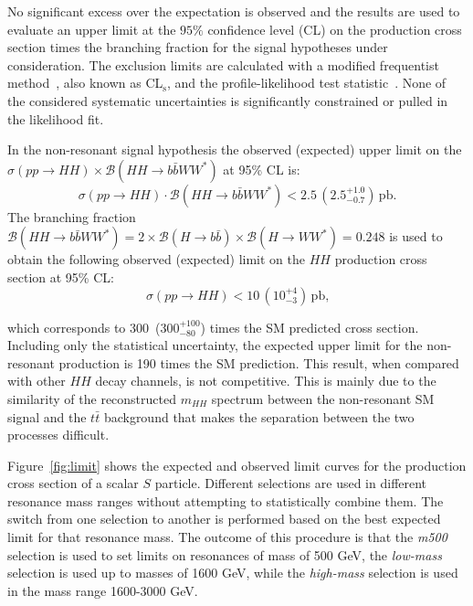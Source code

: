  
No significant excess over the expectation is observed and the results are used to evaluate an upper limit at the $95\%$
confidence level (CL)  on the production cross section times the
branching fraction for the signal hypotheses under consideration.
The exclusion limits are calculated with a modified frequentist
method~\cite{CLs_2002}, also known as CL$_{\mathrm{s}}$, and the
profile-likelihood test statistic~\cite{asymptotics}.  None of the considered
systematic uncertainties is significantly constrained or
pulled in the likelihood fit.
 
In the non-resonant signal hypothesis the observed (expected) upper
limit on the $\sigma(pp \to HH) \times {\mathcal{B}}( HH \to b\bar{b}WW^{\ast})$ at 95\%
CL is:
\[
\sigma(pp \to HH) \cdot {\mathcal{B}}(HH \to b\bar{b}WW^{\ast}) < 2.5 \, \left
 (2.5^{+1.0}_{-0.7} \right )  \,
{\mathrm{pb}}.
\]
The branching fraction ${\mathcal{B}}(HH \to b\bar{b}WW^{\ast}) = 2\times
{\mathcal{B}}(H \to b\bar{b}) \times {\mathcal{B}}(H \to WW^{\ast}) = 0.248$ is used to
obtain the following observed (expected) limit on the $HH$ production cross section at 95\% CL:
\[
\sigma(pp \to HH) < 10 \, \left (10^{+4}_{-3} \right) \,  {\text{pb,}}
\]
 
which corresponds to 300~(300$^{+100}_{-80}$) times the SM predicted cross section.
Including only the statistical uncertainty, the expected upper limit for the non-resonant production is
190 times the SM prediction.
This result, when compared with other $HH$ decay channels, is not competitive.  This is mainly  due to the similarity of the reconstructed $m_{HH}$ spectrum between the non-resonant SM signal
and the $t\bar{t}$ background that makes the separation between the
two processes difficult.
 
Figure~\ref{fig:limit} shows the expected and observed limit
curves for the production cross section of a scalar $S$ particle.
Different selections are used in different resonance mass ranges without attempting to statistically combine them. The
switch from one selection to another is performed based on the
best expected limit for that resonance mass.
The outcome of this procedure is that the \emph{m500} selection is used to set limits on resonances of mass of 500 GeV,  the \emph{low-mass}   selection is used up to masses of 1600 GeV, while the \emph{high-mass} selection is used in the mass range 1600-3000 GeV.
 
